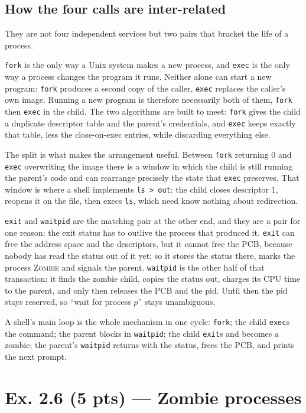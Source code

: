 \subsection*{How the four calls are inter-related}

They are not four independent services but two pairs that bracket the life of a process.

\texttt{fork} is the only way a Unix system makes a new process, and \texttt{exec} is the
only way a process changes the program it runs. Neither alone can start a new program:
\texttt{fork} produces a second copy of the caller, \texttt{exec} replaces the caller's
own image. Running a new program is therefore necessarily both of them, \texttt{fork}
then \texttt{exec} in the child. The two algorithms are built to meet: \texttt{fork}
gives the child a duplicate descriptor table and the parent's credentials, and
\texttt{exec} keeps exactly that table, less the close-on-exec entries, while discarding
everything else.

The split is what makes the arrangement useful. Between \texttt{fork} returning $0$ and
\texttt{exec} overwriting the image there is a window in which the child is still running
the parent's code and can rearrange precisely the state that \texttt{exec} preserves.
That window is where a shell implements \texttt{ls > out}: the child closes descriptor
$1$, reopens it on the file, then execs \texttt{ls}, which need know nothing about
redirection.

\texttt{exit} and \texttt{waitpid} are the matching pair at the other end, and they are a
pair for one reason: the exit status has to outlive the process that produced it.
\texttt{exit} can free the address space and the descriptors, but it cannot free the
PCB, because nobody has read the status out of it yet; so it stores the status there,
marks the process \textsc{Zombie} and signals the parent. \texttt{waitpid} is the other
half of that transaction: it finds the zombie child, copies the status out, charges its
CPU time to the parent, and only then releases the PCB and the pid. Until then the pid
stays reserved, so ``wait for process $p$'' stays unambiguous.

A shell's main loop is the whole mechanism in one cycle: \texttt{fork}; the child
\texttt{exec}s the command; the parent blocks in \texttt{waitpid}; the child
\texttt{exit}s and becomes a zombie; the parent's \texttt{waitpid} returns with the
status, frees the PCB, and prints the next prompt.

\section*{Ex. 2.6 (5 pts) --- Zombie processes}

